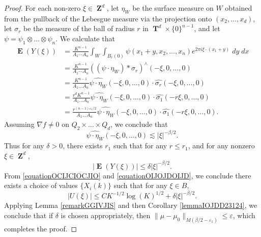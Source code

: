 \documentclass[12pt,reqno]{article}
\numberwithin{equation}{section}
\DeclareMathOperator{\ZZ}{\mathbf{Z}}
\DeclareMathOperator{\TT}{\mathbf{T}}
\numberwithin{theorem}{section}
\DeclareMathOperator{\EE}{\mathbf{E}}
\begin{document}
\begin{proof}
    For each non-zero $\xi \in \ZZ^d$, let $\eta_W$ be the surface measure on $W$ obtained from the pullback of the Lebesgue measure via the projection onto $(x_2,\dots,x_d)$, let $\sigma_r$ be the measure of the ball of radius $r$ in $\TT^d \times \{ 0 \}^{n-1}$, and let $\psi = \psi_1 \otimes \dots \otimes \psi_n$. We calculate that
    \begin{equation}
    \begin{split}
        \EE(Y(\xi)) &= \frac{K^{n-1}}{A_1 \cdots A_n} \int_W \int_{B_r(0)} \psi(x_1 + y,x_2,\dots,x_n) e^{2 \pi i \xi \cdot (x_1 + y)}\; dy\; dx\\
        &= \frac{K^{n-1}}{A_1 \cdots A_n} \left( \left( \psi \cdot \eta_W \right) * \sigma_r \right)^{\wedge}(-\xi,0,\dots,0)\\
        &= \frac{K^{n-1}}{A_1 \dots A_n} \widehat{\psi \cdot \eta_W}(-\xi,0,\dots,0) \cdot \widehat{\sigma_r}(-\xi,0,\dots,0)\\
        &= \frac{r^d K^{n-1}}{A_1 \dots A_n} \widehat{\psi \cdot \eta_W}(-\xi,0,\dots,0) \cdot \widehat{\sigma_1}(-r\xi,0,\dots,0)\\
        &= \frac{r^{(n-1) \varepsilon_1/2}}{A_1 \dots A_n} \widehat{\psi \cdot \eta_W}(-\xi,0,\dots,0) \cdot \widehat{\sigma_1}(-r\xi,0,\dots,0).
    \end{split}
    \end{equation}
    Assuming $\nabla f \neq 0$ on $Q_2 \times \dots \times Q_d$, we conclude that
    \begin{equation}
        \widehat{\psi \cdot \eta_W}(-\xi,0,\dots,0) \lesssim |\xi|^{-\beta/2}.
    \end{equation}
    Thus for any $\delta > 0$, there exists $r_1$ such that for any $r \leq r_1$, and for any nonzero $\xi \in \ZZ^d$,
    \begin{equation} \label{equationOIJOJDOIJD}
        |\EE(Y(\xi))| \leq \delta |\xi|^{-\beta/2}.
    \end{equation}
    From \eqref{equationOCIJCIOCJIO} and \eqref{equationOIJOJDOIJD}, we conclude there exists a choice of values $\{ X_i(k) \}$ such that for any $\xi \in B$,
    \begin{equation}
        |U(\xi)| \leq C K^{-1/2} \log(K)^{1/2} + \delta |\xi|^{-\beta/2}.
    \end{equation}
    Applying Lemma \ref{remarkGGIVJIS} and then Corollary \ref{lemmaIOJDD23124}, we conclude that if $\delta$ is chosen appropriately, then $\| \mu - \mu_0 \|_{M(\beta/2 - \varepsilon_1)} \leq \varepsilon$, which completes the proof.
\end{proof}
\end{document}
